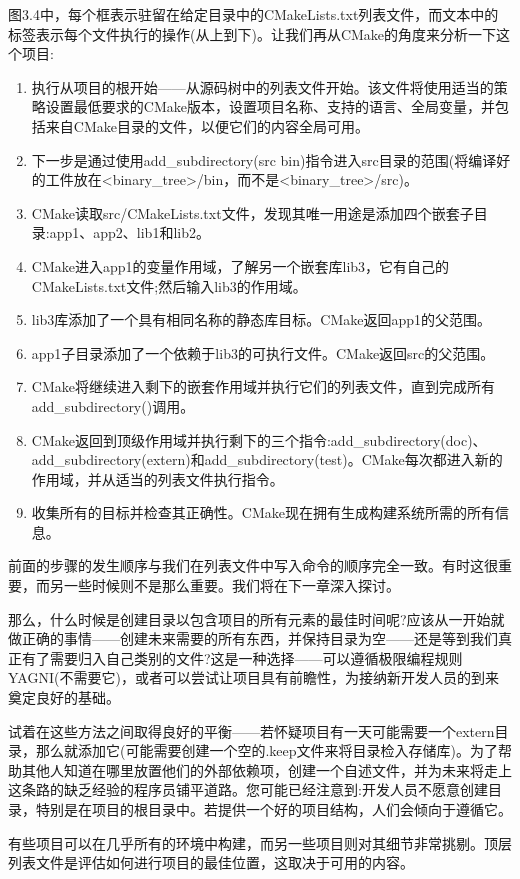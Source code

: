 图3.4中，每个框表示驻留在给定目录中的CMakeLists.txt列表文件，而文本中的标签表示每个文件执行的操作(从上到下)。让我们再从CMake的角度来分析一下这个项目:

\begin{enumerate}
\item 
执行从项目的根开始——从源码树中的列表文件开始。该文件将使用适当的策略设置最低要求的CMake版本，设置项目名称、支持的语言、全局变量，并包括来自CMake目录的文件，以便它们的内容全局可用。

\item 
下一步是通过使用add\_subdirectory(src bin)指令进入src目录的范围(将编译好的工件放在<binary\_tree>/bin，而不是<binary\_tree>/src)。

\item 
CMake读取src/CMakeLists.txt文件，发现其唯一用途是添加四个嵌套子目录:app1、app2、lib1和lib2。

\item 
CMake进入app1的变量作用域，了解另一个嵌套库lib3，它有自己的CMakeLists.txt文件;然后输入lib3的作用域。

\item 
lib3库添加了一个具有相同名称的静态库目标。CMake返回app1的父范围。

\item 
app1子目录添加了一个依赖于lib3的可执行文件。CMake返回src的父范围。

\item 
CMake将继续进入剩下的嵌套作用域并执行它们的列表文件，直到完成所有add\_subdirectory()调用。

\item 
CMake返回到顶级作用域并执行剩下的三个指令:add\_subdirectory(doc)、add\_subdirectory(extern)和add\_subdirectory(test)。CMake每次都进入新的作用域，并从适当的列表文件执行指令。

\item 
收集所有的目标并检查其正确性。CMake现在拥有生成构建系统所需的所有信息。
\end{enumerate}

前面的步骤的发生顺序与我们在列表文件中写入命令的顺序完全一致。有时这很重要，而另一些时候则不是那么重要。我们将在下一章深入探讨。

那么，什么时候是创建目录以包含项目的所有元素的最佳时间呢?应该从一开始就做正确的事情——创建未来需要的所有东西，并保持目录为空——还是等到我们真正有了需要归入自己类别的文件?这是一种选择——可以遵循极限编程规则YAGNI(不需要它)，或者可以尝试让项目具有前瞻性，为接纳新开发人员的到来奠定良好的基础。

试着在这些方法之间取得良好的平衡——若怀疑项目有一天可能需要一个extern目录，那么就添加它(可能需要创建一个空的.keep文件来将目录检入存储库)。为了帮助其他人知道在哪里放置他们的外部依赖项，创建一个自述文件，并为未来将走上这条路的缺乏经验的程序员铺平道路。您可能已经注意到:开发人员不愿意创建目录，特别是在项目的根目录中。若提供一个好的项目结构，人们会倾向于遵循它。

有些项目可以在几乎所有的环境中构建，而另一些项目则对其细节非常挑剔。顶层列表文件是评估如何进行项目的最佳位置，这取决于可用的内容。





